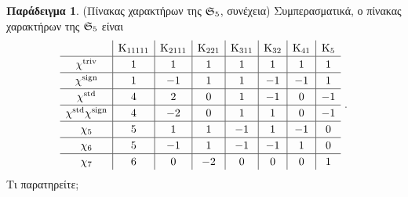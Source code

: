 \documentclass[12pt,a4paper,reqno]{amsart}
\theoremstyle{definition}
\newtheorem*{example}{Παράδειγμα}
\begin{document}
\begin{example}{\rm(Πίνακας χαρακτήρων της $\mathfrak{S}_5$, συνέχεια)}
    Συμπερασματικά, ο πίνακας χαρακτήρων της $\mathfrak{S}_5$ είναι 
    \[
    \renewcommand{\arraystretch}{1.2} 
    \begin{array}{c|c|c|c|c|c|c|c}
                         & \rmK_{11111} & \rmK_{2111} & \rmK_{221} & \rmK_{311} & \rmK_{32} & \rmK_{41} & \rmK_5  \\ \hline
    \chi^\triv           & 1            & 1           & 1          & 1          & 1         & 1         & 1        \\ \hline 
    \chi^\sign           & 1            & -1          & 1          & 1          & -1        & -1        & 1        \\ \hline 
    \chi^\std            & 4            & 2           & 0          & 1          & -1        & 0         & -1        \\ \hline 
    \chi^\std\chi^\sign  & 4            & -2          & 0          & 1          & 1         & 0         & -1       \\\hline
    \chi_5               & 5            & 1           & 1          & -1         & 1         & -1        & 0       \\ \hline
    \chi_6               & 5            & -1          & 1          & -1         & -1        & 1         & 0   \\ \hline
    \chi_7               & 6            & 0           & -2         & 0          & 0         & 0         & 1
    \end{array}\ .
    \]
    Τι παρατηρείτε;
\end{example}
\end{document}
